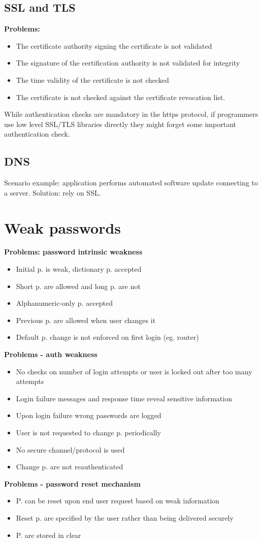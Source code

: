 \documentclass[10pt,a4paper]{article}
\begin{document}
\subsection{SSL and TLS}
\textbf{Problems:}
\begin{itemize}
\item The certificate authority signing the certificate is not validated
\item The signature of the certification authority is not validated for integrity
\item The time validity of the certificate is not checked
\item The certificate is not checked against the certificate revocation list.
\end{itemize}
While authentication checks are mandatory in the https protocol, if programmers use low level SSL/TLS libraries directly they might forget some important authentication check.
\subsection{DNS}
Scenario example: application performs automated software update connecting to a server. Solution: rely on SSL.
\section{Weak passwords}
\textbf{Problems: password intrinsic weakness}
\begin{itemize}
\item Initial p. is weak, dictionary p. accepted
\item Short p. are allowed and long p. are not
\item Alphanumeric-only p. accepted
\item Previous p. are allowed when user changes it
\item Default p. change is not enforced on first login (eg. router)
\end{itemize}
\textbf{Problems - auth weakness}
\begin{itemize}
\item No checks on number of login attempts or user is locked out after too many attempts
\item Login failure messages and response time reveal sensitive information
\item Upon login failure wrong passwords are logged
\item User is not requested to change p. periodically
\item No secure channel/protocol is used
\item Change p. are not reauthenticated
\end{itemize}
\textbf{Problems - password reset mechanism}
\begin{itemize}
\item P. can be reset upon end user request based on weak information
\item Reset p. are specified by the user rather than being delivered securely
\item P. are stored in clear
\end{itemize}
\end{document}
